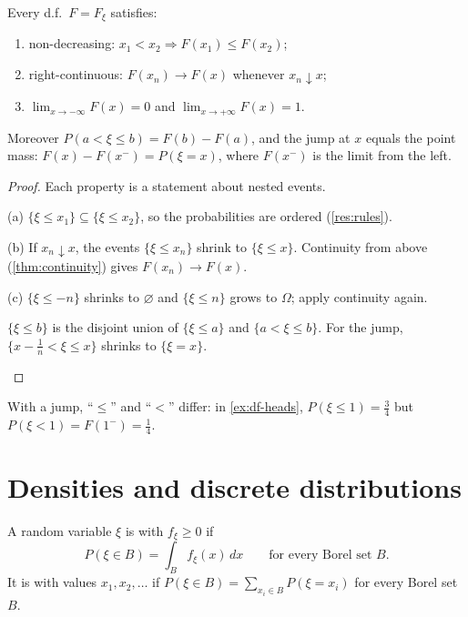 \begin{result}
\label{res:df-props}
Every d.f.\ $F=F_\xi$ satisfies:
\begin{enumerate}[label=(\alph*)]
  \item non-decreasing: $x_1<x_2\Rightarrow F(x_1)\le F(x_2)$;
  \item right-continuous: $F(x_n)\to F(x)$ whenever $x_n\downarrow x$;
  \item $\lim_{x\to-\infty}F(x)=0$ and $\lim_{x\to+\infty}F(x)=1$.
\end{enumerate}
Moreover $P(a<\xi\le b)=F(b)-F(a)$, and the jump at $x$ equals the point mass: $F(x)-F(x^-)=P(\xi=x)$, where $F(x^-)$ is the limit from the left.
\end{result}
\begin{proof}
Each property is a statement about nested events.
\begin{steps}
  \item (a) $\{\xi\le x_1\}\subseteq\{\xi\le x_2\}$, so the probabilities are ordered (\cref{res:rules}).
  \item (b) If $x_n\downarrow x$, the events $\{\xi\le x_n\}$ shrink to $\{\xi\le x\}$. Continuity from above (\cref{thm:continuity}) gives $F(x_n)\to F(x)$.
  \item (c) $\{\xi\le -n\}$ shrinks to $\varnothing$ and $\{\xi\le n\}$ grows to $\Omega$; apply continuity again.
  \item $\{\xi\le b\}$ is the disjoint union of $\{\xi\le a\}$ and $\{a<\xi\le b\}$. For the jump, $\{x-\frac1n<\xi\le x\}$ shrinks to $\{\xi=x\}$. \qedhere
\end{steps}
\end{proof}

With a jump, ``$\le$'' and ``$<$'' differ: in \cref{ex:df-heads}, $P(\xi\le1)=\frac34$ but $P(\xi<1)=F(1^-)=\frac14$.

\section{Densities and discrete distributions}

\begin{definition}
\label{def:density}
A random variable $\xi$ is  with  $f_\xi\ge0$ if
\[
  P(\xi\in B)=\int_B f_\xi(x)\,dx\qquad\text{for every Borel set }B.
\]
It is  with values $x_1,x_2,\ldots$ if $P(\xi\in B)=\sum_{x_i\in B}P(\xi=x_i)$ for every Borel set $B$.
\end{definition}

